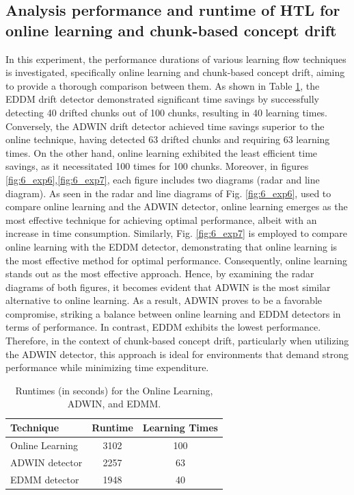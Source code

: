   
\subsection{Analysis performance and runtime of HTL for online learning and chunk-based concept drift}
In this experiment, the performance durations of various learning flow techniques is investigated, specifically online learning and chunk-based concept drift, aiming to provide a thorough comparison between them. As shown in Table \ref{table:6_table4}, the EDDM drift detector demonstrated significant time savings by successfully detecting 40 drifted chunks out of 100 chunks, resulting in 40 learning times. Conversely, the ADWIN drift detector achieved time savings superior to the online technique, having detected 63 drifted chunks and requiring 63 learning times. On the other hand, online learning exhibited the least efficient time savings, as it necessitated 100 times for 100 chunks. Moreover, in figures \ref{fig:6_exp6},\ref{fig:6_exp7}, each figure includes two diagrams (radar and line diagram). As seen in the radar and line diagrams of Fig. \ref{fig:6_exp6}, used to compare online learning and the ADWIN detector, online learning emerges as the most effective technique for achieving optimal performance, albeit with an increase in time consumption. Similarly, Fig. \ref{fig:6_exp7} is employed to compare online learning with the EDDM detector, demonstrating that online learning is the most effective method for optimal performance. Consequently, online learning stands out as the most effective approach. Hence, by examining the radar diagrams of both figures, it becomes evident that ADWIN is the most similar alternative to online learning. As a result, ADWIN proves to be a favorable compromise, striking a balance between online learning and EDDM detectors in terms of performance. In contrast, EDDM exhibits the lowest performance. Therefore, in the context of chunk-based concept drift, particularly when utilizing the ADWIN detector, this approach is ideal for environments that demand strong performance while minimizing time expenditure.

\begin{table}[h]
  \centering
  \caption{Runtimes (in seconds) for the Online Learning, ADWIN, and EDMM.}
  \begin{tabular}{|l|c|c|}
  \hline
  \textbf{Technique}       & \textbf{Runtime} & \textbf{Learning Times} \\ \hline
  Online Learning          & 3102             & 100                     \\ \hline
  ADWIN detector           & 2257             & 63                      \\ \hline
  EDMM detector            & 1948             & 40                      \\ \hline
  \end{tabular}
  \label{table:6_table4}
  \end{table}